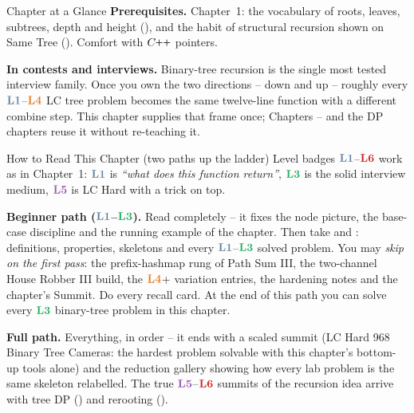 \begin{chaptertheorybox}{Chapter at a Glance}
\textbf{Prerequisites.} Chapter~1: the vocabulary of roots, leaves, subtrees, depth
and height (), and the habit of structural recursion shown on
Same Tree (). Comfort with $\cpp$ pointers.

\textbf{In contests and interviews.} Binary-tree recursion is the single most tested
interview family. Once you own the two directions -- down and up -- roughly every
$\lv1$--$\lv4$ LC tree problem becomes the same twelve-line function with a
different combine step. This chapter supplies that frame once; Chapters
-- and the DP chapters reuse it without re-teaching it.
\end{chaptertheorybox}

\begin{chaptertheorybox}{How to Read This Chapter (two paths up the ladder)}
Level badges $\lv1$--$\lv6$ work as in Chapter~1: $\lv1$ is \emph{``what does this
function return''}, $\lv3$ is the solid interview medium, $\lv5$ is LC Hard with a
trick on top.

\textbf{Beginner path ($\lv1$--$\lv3$).} Read  completely -- it
fixes the node picture, the base-case discipline and the running example of the
chapter. Then take  and : definitions,
properties, skeletons and every $\lv1$--$\lv3$ solved problem. You may \emph{skip on
the first pass}: the prefix-hashmap rung of Path Sum III, the two-channel
House Robber III build, the $\lv4$+ variation entries, the hardening notes and the
chapter's Summit. Do every recall card. At the end of this path you can solve every
$\lv3$ binary-tree problem in this chapter.

\textbf{Full path.} Everything, in order -- it ends with a scaled summit (LC Hard
968 Binary Tree Cameras: the hardest problem solvable with this chapter's bottom-up
tools alone) and the reduction gallery showing how every lab problem is the same
skeleton relabelled. The true $\lv5$--$\lv6$ summits of the recursion idea arrive
with tree DP () and rerooting ().
\end{chaptertheorybox}

